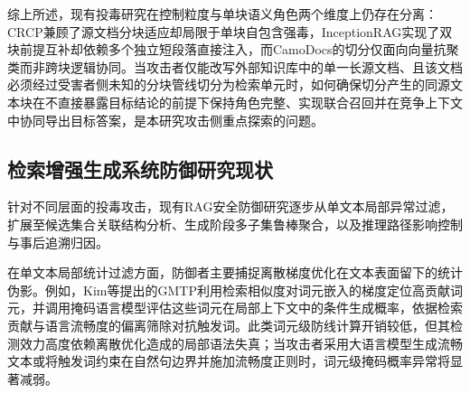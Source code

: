 综上所述，现有投毒研究在控制粒度与单块语义角色两个维度上仍存在分离：CRCP兼顾了源文档分块适应却局限于单块自包含强毒，InceptionRAG实现了双块前提互补却依赖多个独立短段落直接注入，而CamoDocs的切分仅面向向量抗聚类而非跨块逻辑协同。当攻击者仅能改写外部知识库中的单一长源文档、且该文档必须经过受害者侧未知的分块管线切分为检索单元时，如何确保切分产生的同源文本块在不直接暴露目标结论的前提下保持角色完整、实现联合召回并在竞争上下文中协同导出目标答案，是本研究攻击侧重点探索的问题。

\subsection{检索增强生成系统防御研究现状}

针对不同层面的投毒攻击，现有RAG安全防御研究逐步从单文本局部异常过滤，扩展至候选集合关联结构分析、生成阶段多子集鲁棒聚合，以及推理路径影响控制与事后追溯归因。

在单文本局部统计过滤方面，防御者主要捕捉离散梯度优化在文本表面留下的统计伪影。例如，Kim等\cite{kim2025gmtp}提出的GMTP利用检索相似度对词元嵌入的梯度定位高贡献词元，并调用掩码语言模型评估这些词元在局部上下文中的条件生成概率，依据检索贡献与语言流畅度的偏离筛除对抗触发词。此类词元级防线计算开销较低，但其检测效力高度依赖离散优化造成的局部语法失真；当攻击者采用大语言模型生成流畅文本或将触发词约束在自然句边界并施加流畅度正则时，词元级掩码概率异常将显著减弱。


